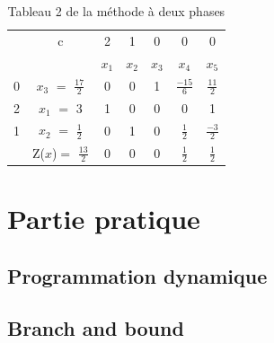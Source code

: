 \documentclass[a4paper, 12pt]{article}
\begin{document}
\begin{itemize}
\begin{table}[h!]
\begin{tabular}{|c|c|c|c|c|c|c|}
	\hline
      & c & 2 & 1 & 0 & 0 & 0 \\ 
      \cline{2-7}
       &  & $x_{1}$ & $x_{2}$  & $x_{3}$  & $x_{4}$ & $x_{5}$ \\
       \hline
   0 & $x_{3}$  $=$ $\frac{17}{2}$ & 0 & 0 & 1 & $\frac{-15}{6}$ & $\frac{11}{2}$ \\
      \hline
	2 & $x_{1}$ $=$ 3 & 1 & 0 & 0 & 0 & 1 \\
	  \hline
	1 & $x_{2}$ $=$ $\frac{1}{2}$  & 0 & 1 & 0 & $\frac{1}{2}$ & $\frac{-3}{2}$\\
	  \hline
	 & Z($x$)$=$ $\frac{13}{2}$ & 0 & 0 & 0 & $\frac{1}{2}$ & $\frac{1}{2}$\\
	  \hline
	\end{tabular}
\caption {Tableau 2 de la méthode à deux phases}
\end{table}


\end{itemize}

\section{Partie pratique}

\subsection{Programmation dynamique}

\subsection{Branch and bound}
\end{document}
